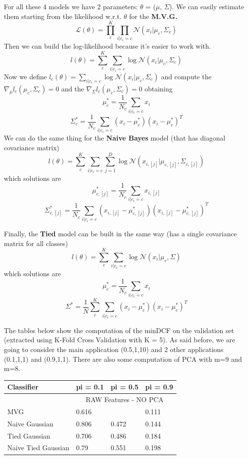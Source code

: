 \documentclass[english]{report}
\begin{document}
For all these 4 models we have 2 parameters: $\theta$ = ($\mu$, $\Sigma$). We can easily estimate them starting
from the likelihood w.r.t. $\theta$ for the \textbf{M.V.G.}
\[ \mathcal{L} (\theta) = \prod_{c}^{K}\prod_{i|c_i=c} \mathcal{N} (x_i|\mu_c,\Sigma_c)\]
Then we can build the log-likelihood because it's easier to work with.
\[ l (\theta) = \sum_{c}^{K}\sum_{i|c_i=c} \log \mathcal{N} (x_i|\mu_c,\Sigma_c)\]
Now we define \( l_c (\theta) = \sum_{i|c_i=c} \log \mathcal{N} (x_i|\mu_c,\Sigma_c)\) and compute
the $\nabla_\mu l_c(\mu_c,\Sigma_c) = 0$ and the $\nabla_\Sigma l_c(\mu_c,\Sigma_c) = 0$ 
obtaining 
\[\mu_c^* = \frac{1}{N_c}\sum_{i|c_i=c}x_i\]
\[\Sigma_c^* = \frac{1}{N_c}\sum_{i|c_i=c}(x_i-\mu_c^*)(x_i-\mu_c^*)^T\]
We can do the same thing for the \textbf{Naive Bayes} model (that has diagonal covariance matrix)
\[ l (\theta) = \sum_{c}^{K}\sum_{i|c_i=c}\sum_{j=1}^{D} \log \mathcal{N} (x_{i,[j]}|\mu_{c,[j]},\Sigma_{c,[j]})\]
which solutions are
\[\mu_{c,[j]}^* = \frac{1}{N_c}\sum_{i|c_i=c}x_{i,[j]}\] 
\[\Sigma_{c,[j]}^* = \frac{1}{N_c}\sum_{i|c_i=c}(x_{i,[j]}-\mu_{c,[j]}^*)(x_{i,[j]}-\mu_{c,[j]}^*)^T\] 

Finally, the \textbf{Tied} model can be built in the same way (has a single covariance matrix for all classes)
\[ l (\theta) = \sum_{c}^{K}\sum_{i|c_i=c} \log \mathcal{N} (x_i|\mu_c,\Sigma)\]
which solutions are
\[\mu_{c}^* = \frac{1}{N_c}\sum_{i|c_i=c}x_{i}\] 
\[\Sigma^* = \frac{1}{N}\sum_{c}^{K}\sum_{i|c_i=c}(x_{i}-\mu_{c}^*)(x_{i}-\mu_{c}^*)^T\] 

The tables below show the computation of the minDCF on the validation set (extracted using K-Fold Cross Validation with K = 5).
As said before, we are going to consider the main application (0.5,1,10) and 2 other applications (0.1,1,1) and (0.9,1,1).
There are also some computation of PCA with m=9 and m=8.

\begin{table}[H]
    \centering
    \begin{tabular}{@{}llll@{}}
    \toprule
    Classifier          & pi = 0.1  & pi = 0.5  & pi = 0.9 \\ \midrule
                        & \multicolumn{3}{c}{RAW Features - NO PCA} \\ \midrule
    MVG                 & 0.616     & \color{red}{0.331}     & 0.111    \\
    Naive Gaussian      & 0.806     & 0.472     & 0.144    \\
    Tied Gaussian       & 0.706     & 0.486     & 0.184    \\
    Naive Tied Gaussian & 0.79      & 0.551     & 0.198    \\ \bottomrule
    \end{tabular}
    \label{tab:MVG_RAW_valid}
\end{table}
\end{document}

